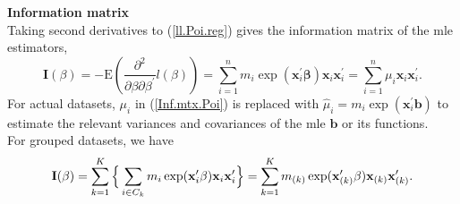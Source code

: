\documentclass[12pt]{article}
\def\E{\mathrm{E}}
\begin{document}
\noindent\textbf{Information matrix\\}
Taking second derivatives to (\ref{ll.Poi.reg}) gives the information matrix of the mle estimators,
\begin{equation}
\label{Inf.mtx.Poi}
\mathbf{ I}(\beta)=-\E\left( \frac{\partial^2}{\partial \beta\partial \beta^{\prime}}l(\beta) \right)=\sum^n_{i=1}m_i \exp(\mathbf{ x}^{\prime}_i \mathbf{ \beta})\mathbf{ x}_i \mathbf{ x}_i^{\prime}=\sum^n_{i=1} {\mu}_i \mathbf{ x}_i \mathbf{ x}_i^{\prime}.
\end{equation} For actual datasets, ${\mu}_i$ in (\ref{Inf.mtx.Poi}) is replaced with $\hat{\mu}_i=m_i \exp(\mathbf{ x}^{\prime}_i \mathbf{ b})$ to estimate the relevant variances and covariances of the mle $\mathbf{ b}$ or its functions.\\

For grouped datasets, we have 
\begin{equation}
\label{ }\nonumber
\mathbf{ I}(\beta)=\sum^K_{k=1} \Big{\{}\sum_{i \in C_k}m_i \exp(\mathbf{ x}^{\prime}_i \mathbf{ \beta})\mathbf{ x}_i \mathbf{ x}_i^{\prime} \Big{\}}=\sum^K_{k=1} m_{(k)} \exp(\mathbf{ x}^{\prime}_{(k)} \mathbf{ \beta})\mathbf{ x}_{(k)} \mathbf{ x}_{(k)}^{\prime}.
\end{equation}
%
%
%


\ifx\undefined\bysame
\newcommand{\bysame}{\hskip.3em \leavevmode\rule[.5ex]{3em}{.3pt}\hskip0.5em}
\fi
\end{document}
